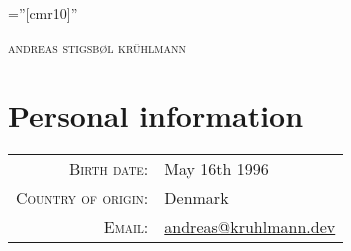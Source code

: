 \documentclass[a4paper,10pt]{article}
\begin{document}
\pagestyle{empty}

\font\fb=''[cmr10]''

\par{\centering
	{\Huge \textsc{andreas stigsb\o l kr\"uhlmann}
	}\bigskip\par}

\section{Personal information}
\begin{tabular}{rl}
	\textsc{Birth date:}        & May 16th 1996                                              \\
	\textsc{Country of origin:} & Denmark                                                    \\
	\textsc{Email:}             & \href{mailto:andreas@kruhlmann.dev}{andreas@kruhlmann.dev} \\
\end{tabular}
\end{document}
